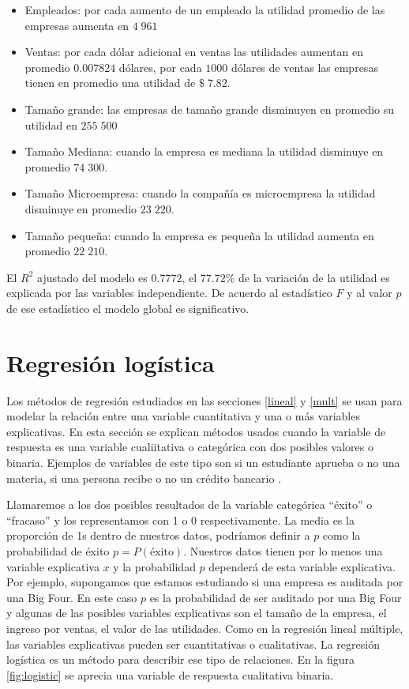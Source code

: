 \documentclass[
]{krantz}
\providecommand{\tightlist}{%
  \setlength{\itemsep}{0pt}\setlength{\parskip}{0pt}}
\begin{document}
\begin{itemize}
\tightlist
\item
  Empleados: por cada aumento de un empleado la utilidad promedio de las empresas aumenta en \(4\;961\)
\item
  Ventas: por cada dólar adicional en ventas las utilidades aumentan en promedio \(0.007824\) dólares, por cada \(1000\) dólares de ventas las empresas tienen en promedio una utilidad de \(\$\;7.82\).
\item
  Tamaño grande: las empresas de tamaño grande disminuyen en promedio su utilidad en \(255\;500\)
\item
  Tamaño Mediana: cuando la empresa es mediana la utilidad disminuye en promedio \(74\;300\).
\item
  Tamaño Microempresa: cuando la compañía es microempresa la utilidad disminuye en promedio \(23\;220\).
\item
  Tamaño pequeña: cuando la empresa es pequeña la utilidad aumenta en promedio \(22\;210\).
\end{itemize}

El \(R^2\) ajustado del modelo es \(0.7772\), el \(77.72\)\% de la variación de la utilidad es explicada por las variables independiente. De acuerdo al estadístico \(F\) y al valor \(p\) de ese estadístico el modelo global es significativo.

\hypertarget{regresion-logistica}{%
\section{Regresión logística}\label{regresion-logistica}}

Los métodos de regresión estudiados en las secciones \ref{lineal} y \ref{mult} se usan para modelar la relación entre una variable cuantitativa y una o más variables explicativas. En esta sección se explican métodos usados cuando la variable de respuesta es una variable cualiitativa o categórica con dos posibles valores o binaria. Ejemplos de variables de este tipo son si un estudiante aprueba o no una materia, si una persona recibe o no un crédito bancario \citep{kleinbaum2009}.

Llamaremos a los dos posibles resultados de la variable categórica ``éxito'' o ``fracaso'' y los representamos con 1 o 0 respectivamente. La media es la proporción de 1s dentro de nuestros datos, podríamos definir a \(p\) como la probabilidad de éxito \(p=P(\text{éxito})\). Nuestros datos tienen por lo menos una variable explicativa \(x\) y la probabilidad \(p\) dependerá de esta variable explicativa. Por ejemplo, supongamos que estamos estudiando si una empresa es auditada por una Big Four. En este caso \(p\) es la probabilidad de ser auditado por una Big Four y algunas de las posibles variables explicativas son el tamaño de la empresa, el ingreso por ventas, el valor de las utilidades. Como en la regresión lineal múltiple, las variables explicativas pueden ser cuantitativas o cualitativas. La regresión logística es un método para describir ese tipo de relaciones. En la figura \ref{fig:logistic} se aprecia una variable de respuesta cualitativa binaria.
\end{document}
